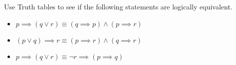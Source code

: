 \documentclass[addpoints]{exam}
\newenvironment{problem}[2][Problem]{\begin{trivlist}
    \item[\hskip \labelsep {\bfseries #1}\hskip \labelsep {\bfseries #2.}]}{\end{trivlist}}
\begin{document}
\begin{problem}{8}
Use Truth tables to see if the following statements are logically equivalent.
\begin{itemize}
    \item [(a)] $ p \implies (q \lor r) \equiv (q \implies p) \land (p \implies r) $
    \item [(b)] $ (p \lor q) \implies r \equiv (p \implies r) \land (q \implies r) $
    \item [(c)] $ p \implies (q \lor r) \equiv \neg r \implies ( p \implies q) $
\end{itemize}

\end{problem}

\begin{questions}
    \question
    \begin{solution}
        
    \end{solution}

\end{questions}
\end{document}
